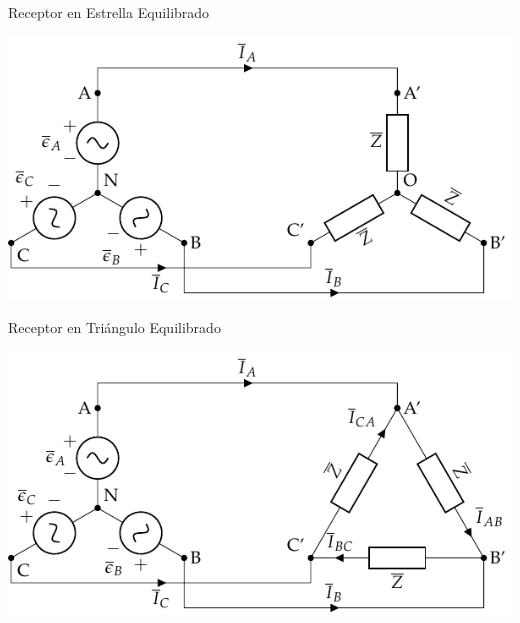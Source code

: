 \documentclass[aspectratio=169, usenames,svgnames,dvipsnames]{beamer}
\begin{document}
\begin{frame}[label={sec:org9a7897d}]{Receptor en Estrella Equilibrado}
\begin{center}
\includegraphics[width=.9\linewidth]{../figs/EstrellaEquilibrado_SinNeutro.pdf}
\end{center}
\end{frame}

\begin{frame}[label={sec:org0e960b4}]{Receptor en Triángulo Equilibrado}
\begin{center}
\includegraphics[width=.9\linewidth]{../figs/TrianguloEquilibrado.pdf}
\end{center}
\end{frame}
\end{document}
